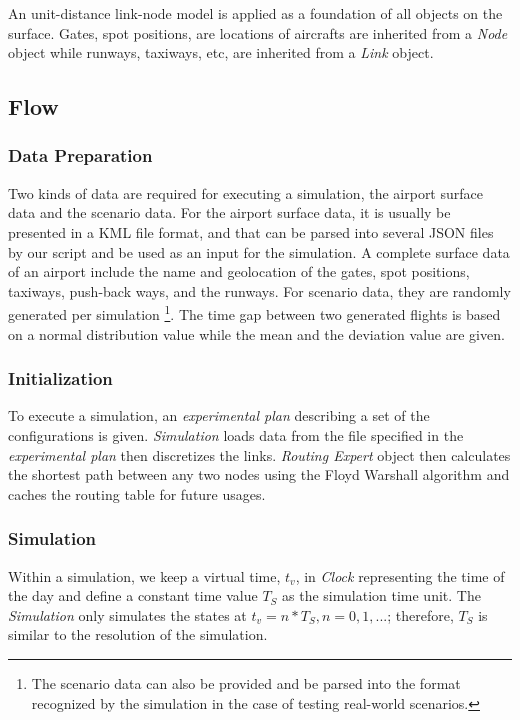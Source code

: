 \documentclass[letterpaper, 10 pt, conference]{ieeeconf}
\begin{document}
An unit-distance link-node model is applied as a foundation of all objects on the surface. Gates, spot positions, are locations of aircrafts are inherited from a {\it Node} object while runways, taxiways, etc, are inherited from a {\it Link} object.

\subsection{Flow}



\subsubsection{Data Preparation}

Two kinds of data are required for executing a simulation, the airport surface data and the scenario data. For the airport surface data, it is usually be presented in a KML file format, and that can be parsed into several JSON files by our script and be used as an input for the simulation. A complete surface data of an airport include the name and geolocation of the gates, spot positions, taxiways, push-back ways, and the runways. For scenario data, they are randomly generated per simulation \footnote{The scenario data can also be provided and be parsed into the format recognized by the simulation in the case of testing real-world scenarios.}. The time gap between two generated flights is based on a normal distribution value while the mean and the deviation value are given.

\subsubsection{Initialization}

To execute a simulation, an {\it experimental plan} describing a set of the configurations is given. {\it Simulation} loads data from the file specified in the {\it experimental plan} then discretizes the links. {\it Routing Expert} object then calculates the shortest path between any two nodes using the Floyd Warshall algorithm and caches the routing table for future usages.

\subsubsection{Simulation}

Within a simulation, we keep a virtual time, $t_v$, in {\it Clock} representing the time of the day and define a constant time value $T_S$ as the simulation time unit. The {\it Simulation} only simulates the states at $t_v = n * T_S, n = 0, 1, ...$; therefore, $T_S$ is similar to the resolution of the simulation.
\end{document}
